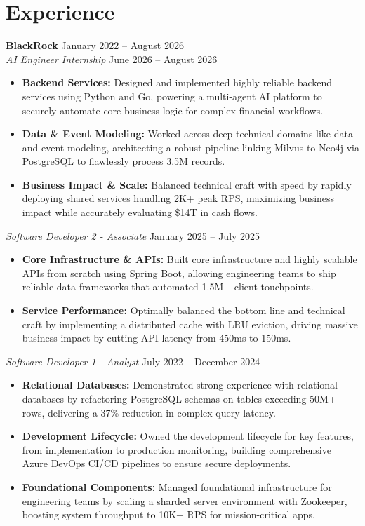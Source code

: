 \documentclass[11pt,a4paper]{article}
\begin{document}
\section{Experience}
\noindent
\textbf{BlackRock} \hfill January 2022 -- August 2026 \\
\textit{AI Engineer Internship} \hfill June 2026 -- August 2026
\begin{itemize}[leftmargin=*,noitemsep,topsep=0pt]
    \item \textbf{Backend Services:} Designed and implemented highly reliable backend services using Python and Go, powering a multi-agent AI platform to securely automate core business logic for complex financial workflows.
    \item \textbf{Data \& Event Modeling:} Worked across deep technical domains like data and event modeling, architecting a robust pipeline linking Milvus to Neo4j via PostgreSQL to flawlessly process 3.5M records.
    \item \textbf{Business Impact \& Scale:} Balanced technical craft with speed by rapidly deploying shared services handling 2K+ peak RPS, maximizing business impact while accurately evaluating \$14T in cash flows.
\end{itemize}

\vspace{3pt}
\noindent
\textit{Software Developer 2 - Associate} \hfill January 2025 -- July 2025
\begin{itemize}[leftmargin=*,noitemsep,topsep=0pt]
    \item \textbf{Core Infrastructure \& APIs:} Built core infrastructure and highly scalable APIs from scratch using Spring Boot, allowing engineering teams to ship reliable data frameworks that automated 1.5M+ client touchpoints.
    \item \textbf{Service Performance:} Optimally balanced the bottom line and technical craft by implementing a distributed cache with LRU eviction, driving massive business impact by cutting API latency from 450ms to 150ms.
\end{itemize}

\vspace{3pt}
\noindent
\textit{Software Developer 1 - Analyst} \hfill July 2022 -- December 2024
\begin{itemize}[leftmargin=*,noitemsep,topsep=0pt]
    \item \textbf{Relational Databases:} Demonstrated strong experience with relational databases by refactoring PostgreSQL schemas on tables exceeding 50M+ rows, delivering a 37\% reduction in complex query latency.
    \item \textbf{Development Lifecycle:} Owned the development lifecycle for key features, from implementation to production monitoring, building comprehensive Azure DevOps CI/CD pipelines to ensure secure deployments.
    \item \textbf{Foundational Components:} Managed foundational infrastructure for engineering teams by scaling a sharded server environment with Zookeeper, boosting system throughput to 10K+ RPS for mission-critical apps.
\end{itemize}
\end{document}

